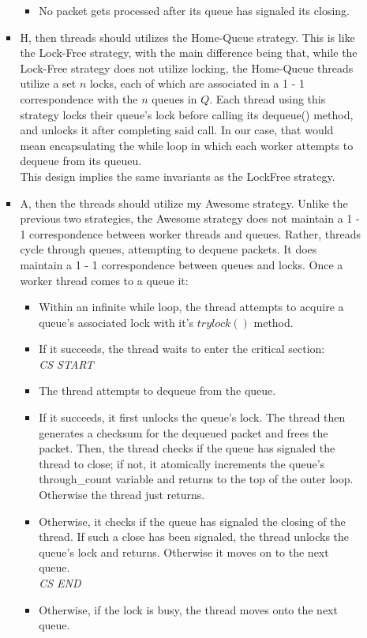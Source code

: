 \documentclass[]{article}
\begin{document}
\begin{itemize}
\begin{itemize}
\begin{itemize}
\begin{itemize}
				\item No packet gets processed after its queue has signaled its closing.
			\end{itemize}
			\item H, then threads should utilizes the Home-Queue strategy. This is like the Lock-Free strategy, with the main difference being that, while the Lock-Free strategy does not utilize locking, the Home-Queue threads utilize a set $n$ locks, each of which are associated in a 1 - 1 correspondence with the $n$ queues in $Q$. Each thread using this strategy locks their queue's lock before calling its dequeue() method, and unlocks it after completing said call. In our case, that would mean encapsulating the while loop in which each worker attempts to dequeue from its queueu.
			\\
			This design implies the same invariants as the LockFree strategy.
			\item A, then the threads should utilize my Awesome strategy. Unlike the previous two strategies, the Awesome strategy does not maintain a 1 - 1 correspondence between worker threads and queues. Rather, threads cycle through queues, attempting to dequeue packets. It does maintain a 1 - 1 correspondence between queues and locks. Once a worker thread comes to a queue it:
			\begin{itemize}
				\item Within an infinite while loop, the thread attempts to acquire a queue's associated lock with it's $trylock()$ method.
				\item If it succeeds, the thread waits to enter the critical section:
				\\
				\textit{CS START}
				\item The thread attempts to dequeue from the queue.
				\item If it succeeds, it first unlocks the queue's lock. The thread then generates a checksum for the dequeued packet and frees the packet. Then, the thread checks if the queue has signaled the thread to close; if not, it atomically increments the queue's through\_count variable and returns to the top of the outer loop. Otherwise the thread just returns.
				\item Otherwise, it checks if the queue has signaled the closing of the thread. If such a close has been signaled, the thread unlocks the queue's lock and returns. Otherwise it moves on to the next queue.
				\\
				\textit{CS END}
				\item Otherwise, if the lock is busy, the thread moves onto the next queue.

\end{itemize}
\end{itemize}
\end{itemize}
\end{itemize}
\end{document}
